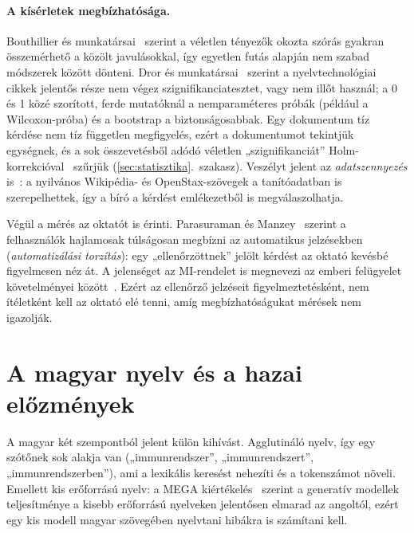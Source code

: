 \paragraph{A kísérletek megbízhatósága.}\label{sec:irod-meres}
Bouthillier és munkatársai~\cite{bouthillier2021variance} szerint a véletlen tényezők okozta szórás
gyakran összemérhető a közölt javulásokkal, így egyetlen futás alapján nem szabad módszerek között dönteni.
Dror és munkatársai~\cite{dror2018hitchhiker} szerint a nyelvtechnológiai cikkek jelentős része nem végez
szignifikanciatesztet, vagy nem illőt használ; a 0 és 1 közé szorított, ferde mutatóknál a nemparaméteres
próbák (például a Wilcoxon-próba) és a bootstrap a biztonságosabbak. Egy dokumentum tíz kérdése nem tíz
független megfigyelés, ezért a dokumentumot tekintjük egységnek, és a sok összevetésből adódó véletlen
„szignifikanciát” Holm-korrekcióval~\cite{holm1979} szűrjük (\ref{sec:statisztika}.~szakasz). Veszélyt
jelent az \emph{adatszennyezés} is~\cite{sainz2023contamination}: a nyilvános Wikipédia- és
OpenStax-szövegek a tanítóadatban is szerepelhettek, így a bíró a kérdést emlékezetből is
megválaszolhatja.

Végül a mérés az oktatót is érinti. Parasuraman és Manzey~\cite{parasuraman2010complacency} szerint a
felhasználók hajlamosak túlságosan megbízni az automatikus jelzésekben (\emph{automatizálási torzítás}):
egy „ellenőrzöttnek” jelölt kérdést az oktató kevésbé figyelmesen néz át. A jelenséget az MI-rendelet is
megnevezi az emberi felügyelet követelményei között~\cite{aiact2024}. Ezért az ellenőrző jelzéseit
figyelmeztetésként, nem ítéletként kell az oktató elé tenni, amíg megbízhatóságukat mérések nem igazolják.

\section{A magyar nyelv és a hazai előzmények}
\label{sec:irod-magyar}

A magyar két szempontból jelent külön kihívást. Agglutináló nyelv, így egy szótőnek sok alakja van
(„immunrendszer”, „immunrendszert”, „immunrendszerben”), ami a lexikális keresést nehezíti és a
tokenszámot növeli. Emellett kis erőforrású nyelv: a MEGA kiértékelés~\cite{ahuja2023mega} szerint a
generatív modellek teljesítménye a kisebb erőforrású nyelveken jelentősen elmarad az angoltól, ezért egy
kis modell magyar szövegében nyelvtani hibákra is számítani kell.

